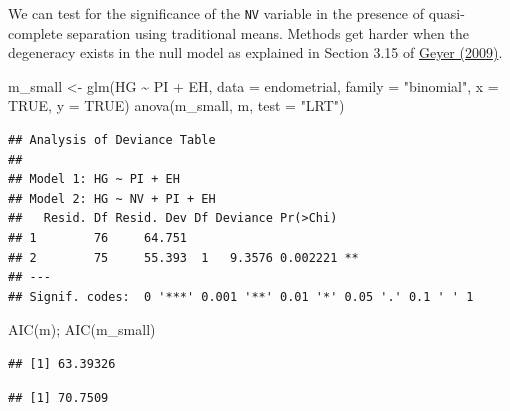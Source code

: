 \documentclass[
  ignorenonframetext,
]{beamer}
\newenvironment{Shaded}{\begin{snugshade}}{\end{snugshade}}
\newcommand{\AttributeTok}[1]{\textcolor[rgb]{0.77,0.63,0.00}{#1}}
\newcommand{\ConstantTok}[1]{\textcolor[rgb]{0.00,0.00,0.00}{#1}}
\newcommand{\FunctionTok}[1]{\textcolor[rgb]{0.00,0.00,0.00}{#1}}
\newcommand{\NormalTok}[1]{#1}
\newcommand{\OtherTok}[1]{\textcolor[rgb]{0.56,0.35,0.01}{#1}}
\newcommand{\SpecialCharTok}[1]{\textcolor[rgb]{0.00,0.00,0.00}{#1}}
\newcommand{\StringTok}[1]{\textcolor[rgb]{0.31,0.60,0.02}{#1}}
\begin{document}
\begin{frame}[fragile]{}
\protect\hypertarget{section-28}{}
We can test for the significance of the \texttt{NV} variable in the
presence of quasi-complete separation using traditional means. Methods
get harder when the degeneracy exists in the null model as explained in
Section 3.15 of
\href{https://projecteuclid.org/journals/electronic-journal-of-statistics/volume-3/issue-none/Likelihood-inference-in-exponential-families-and-directions-of-recession/10.1214/08-EJS349.full}{Geyer
(2009)}.

\vspace{12pt}
\tiny

\begin{Shaded}
\begin{Highlighting}[]
\NormalTok{m\_small }\OtherTok{\textless{}{-}} \FunctionTok{glm}\NormalTok{(HG }\SpecialCharTok{\textasciitilde{}}\NormalTok{ PI }\SpecialCharTok{+}\NormalTok{ EH, }\AttributeTok{data =}\NormalTok{ endometrial, }\AttributeTok{family =} \StringTok{"binomial"}\NormalTok{, }
         \AttributeTok{x =} \ConstantTok{TRUE}\NormalTok{, }\AttributeTok{y =} \ConstantTok{TRUE}\NormalTok{)}
\FunctionTok{anova}\NormalTok{(m\_small, m, }\AttributeTok{test =} \StringTok{"LRT"}\NormalTok{)}
\end{Highlighting}
\end{Shaded}

\begin{verbatim}
## Analysis of Deviance Table
## 
## Model 1: HG ~ PI + EH
## Model 2: HG ~ NV + PI + EH
##   Resid. Df Resid. Dev Df Deviance Pr(>Chi)   
## 1        76     64.751                        
## 2        75     55.393  1   9.3576 0.002221 **
## ---
## Signif. codes:  0 '***' 0.001 '**' 0.01 '*' 0.05 '.' 0.1 ' ' 1
\end{verbatim}

\begin{Shaded}
\begin{Highlighting}[]
\FunctionTok{AIC}\NormalTok{(m); }\FunctionTok{AIC}\NormalTok{(m\_small)}
\end{Highlighting}
\end{Shaded}

\begin{verbatim}
## [1] 63.39326
\end{verbatim}

\begin{verbatim}
## [1] 70.7509
\end{verbatim}
\end{frame}
\end{document}
